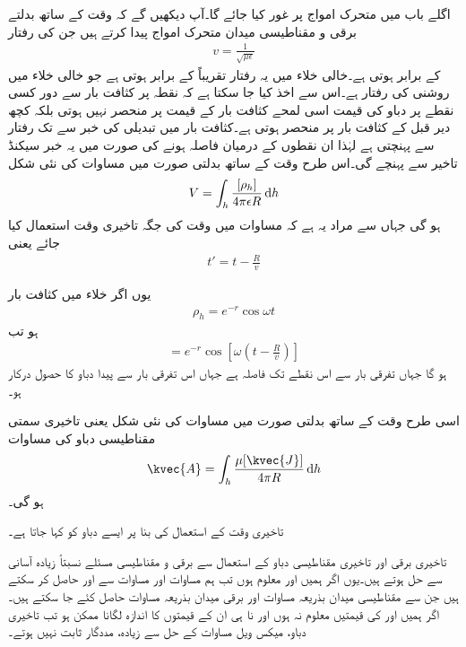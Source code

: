 اگلے باب میں متحرک امواج پر غور کیا جائے گا۔آپ دیکھیں گے کہ وقت کے ساتھ بدلتے برقی و مقناطیسی میدان متحرک امواج پیدا کرتے ہیں جن کی رفتار 
\begin{align}
v=\frac{1}{\sqrt{\mu \epsilon}}
\end{align} 
کے برابر ہوتی ہے۔خالی خلاء میں یہ رفتار تقریباً  کے برابر ہوتی ہے جو خالی خلاء میں روشنی کی رفتار ہے۔اس سے اخذ کیا جا سکتا ہے کہ نقطہ  پر کثافت بار سے دور کسی نقطے  پر دباو کی قیمت اسی لمحے کثافت بار کے قیمت پر منحصر نہیں ہوتی بلکہ کچھ دیر قبل کے کثافت بار پر منحصر ہوتی ہے۔کثافت بار میں تبدیلی کی خبر  سے  تک رفتار  سے پہنچتی ہے لہٰذا ان نقطوں کے درمیان فاصلہ  ہونے کی صورت میں یہ خبر  سیکنڈ تاخیر سے پہنچے گی۔اس طرح وقت کے ساتھ بدلتی صورت میں مساوات   کی نئی شکل
\begin{align}\label{مساوات_میکس_ویل_تاخیری_غیر_سمتی_دباو}
V=\int_h \frac{[\rho_h]}{4\pi \epsilon R} \dif h
\end{align}
ہو گی جہاں  سے مراد یہ ہے کہ مساوات میں وقت  کی جگہ تاخیری وقت  استعمال کیا جائے یعنی
\begin{align*}
t'=t-\frac{R}{v}
\end{align*}

یوں اگر خلاء میں کثافت بار
\begin{align*}
\rho_h=e^{-r} \cos \omega t
\end{align*}
ہو تب
\begin{align*}
[\rho_h]=e^{-r} \cos \left[\omega \left(t-\frac{R}{v} \right) \right]
\end{align*}
ہو گا جہاں  تفرقی بار سے اس نقطے تک فاصلہ ہے جہاں اس تفرقی بار سے پیدا دباو کا حصول درکار ہو۔

اسی طرح وقت کے ساتھ بدلتی صورت میں مساوات  کی نئی شکل یعنی تاخیری سمتی مقناطیسی دباو کی مساوات
\begin{align}\label{مساوات_میکس_ویل_تاخیری_سمتی_دباو}
\kvec{A}=\int_h \frac{\mu [\kvec{J}]}{4\pi R} \dif h
\end{align}
ہو گی۔

تاخیری وقت کے استعمال کی بنا پر ایسے دباو کو  کہا جاتا ہے۔

تاخیری برقی اور تاخیری مقناطیسی دباو کے استعمال سے برقی و مقناطیسی مسئلے نسبتاً زیادہ آسانی سے حل ہوتے ہیں۔یوں اگر ہمیں  اور  معلوم ہوں تب ہم مساوات  اور مساوات  سے  اور  حاصل کر سکتے ہیں جن سے مقناطیسی میدان بذریعہ مساوات  اور برقی میدان بذریعہ مساوات  حاصل کئے جا سکتے ہیں۔اگر ہمیں  اور  کی قیمتیں معلوم نہ ہوں اور نا ہی ان کے قیمتوں کا اندازہ لگانا ممکن ہو تب تاخیری دباو، میکس ویل مساوات کے حل سے زیادہ، مددگار ثابت نہیں ہوتے۔ 

